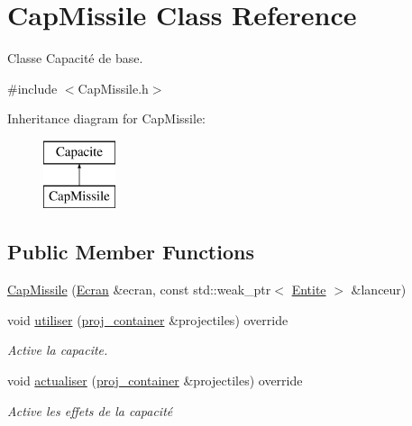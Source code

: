 \hypertarget{class_cap_missile}{}\section{Cap\+Missile Class Reference}
\label{class_cap_missile}


Classe Capacité de base.  




{\ttfamily \#include $<$Cap\+Missile.\+h$>$}

Inheritance diagram for Cap\+Missile\+:\begin{figure}[H]
\begin{center}
\leavevmode
\includegraphics[height=2.000000cm]{class_cap_missile}
\end{center}
\end{figure}
\subsection*{Public Member Functions}
\begin{DoxyCompactItemize}
\item 
\mbox{\hyperlink{class_cap_missile_a6cb9e154556aab9d8a7f41bd7d7cfdbc}{Cap\+Missile}} (\mbox{\hyperlink{class_ecran}{Ecran}} \&ecran, const std\+::weak\+\_\+ptr$<$ \mbox{\hyperlink{class_entite}{Entite}} $>$ \&lanceur)
\item 
void \mbox{\hyperlink{class_cap_missile_a8972a92894ca15903563ec41bc63c6ef}{utiliser}} (\mbox{\hyperlink{def__type_8h_a87980cd8ee9533e561a73e8bbc728188}{proj\+\_\+container}} \&projectiles) override
\begin{DoxyCompactList}\small\item\em Active la capacite. \end{DoxyCompactList}\item 
void \mbox{\hyperlink{class_cap_missile_ae61423876aa92fc8e2555b1b856a7443}{actualiser}} (\mbox{\hyperlink{def__type_8h_a87980cd8ee9533e561a73e8bbc728188}{proj\+\_\+container}} \&projectiles) override
\begin{DoxyCompactList}\small\item\em Active les effets de la capacité \end{DoxyCompactList}\end{DoxyCompactItemize}
